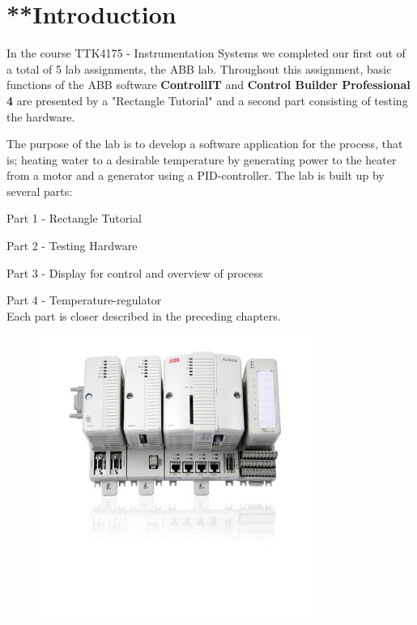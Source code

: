 \section*{      **Introduction}

In the course TTK4175 - Instrumentation Systems we completed our first out of a total of 5 lab assignments, the ABB lab. Throughout this assignment, basic functions of the ABB software \textbf{ControllIT} and \textbf{Control Builder Professional 4} are presented by a "Rectangle Tutorial" and a second part consisting of testing the hardware.

The purpose of the lab is to develop a software application for the process, that is; heating water to a desirable temperature by generating power to the heater from a motor and a generator using a PID-controller. The lab is built up by several parts:

Part 1 - Rectangle Tutorial

Part 2 - Testing Hardware

Part 3 - Display for control and overview of process

Part 4 - Temperature-regulator\\

Each part is closer described in the preceding chapters.

\begin{figure}[!htb]
    \centering
    \includegraphics[width=0.8\textwidth]{images/presentation}
    \end{figure}